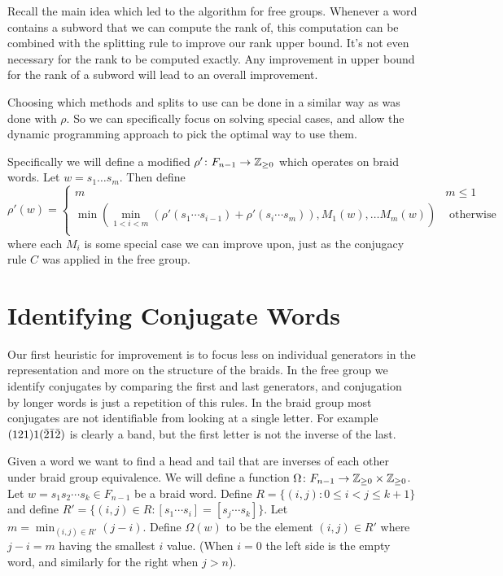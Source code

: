 \documentclass[12pt]{thesis}
\begin{document}
Recall the main idea which led to the algorithm for free groups.
Whenever a word contains a subword that we can compute the rank of,
this computation can be combined with the splitting rule to improve
our rank upper bound.
It's not even necessary for the rank to be computed exactly.
Any improvement in upper bound for the rank of a subword  will lead
to an overall improvement.
 
Choosing which methods and splits to use
can be done in a similar way as was done with $\rho$.
So we can specifically focus on solving special cases,
and allow the dynamic programming approach to pick the optimal
way to use them.

Specifically we will define a modified $\rho' \colon F_{n-1} \rightarrow \mathbb{Z}_{\geq 0}$ which operates
on braid words.
Let $w = s_{1} \ldots s_{m}$. Then define
\begin{equation}
\rho'(w) =
\begin{cases}
    m & m \leq 1 \\
    \min( \min_{1< i < m} ( \rho'(s_{1} \cdots s_{i - 1}) + \rho'(s_{i} \cdots s_{m}) ), M_{1}(w), \ldots M_{m}(w)) &  \text{ otherwise } \\
\end{cases}
\end{equation}
where each $M_{i}$ is some special
case we can improve upon, just as the conjugacy rule $C$ was applied in the free group.

\section{Identifying Conjugate Words}

Our first heuristic for improvement is to focus less on individual generators in the representation
and more on the structure of the braids.
In the free group we identify conjugates by comparing the first and last generators,
and conjugation by longer words is just a repetition of this rules.
In the braid group most conjugates are not identifiable from looking at a single
letter.
For example $(1 2 1) 1 (\bar{2} \bar{1} \bar{2})$ is clearly a band,
but the first letter is not the inverse of the last.

Given a word  we want to find a head
and tail that are inverses of each other under braid group equivalence.
We will define a function $\Omega \colon F_{n-1} \rightarrow \mathbb{Z}_{\geq 0} \times \mathbb{Z}_{\geq 0}$.
Let $w = s_{1}s_{2} \cdots  s_{k} \in F_{n-1}$ be a braid word.
Define $R = \{ (i, j) \colon  0 \leq i < j \leq k + 1 \}$ 
and define $R' = \{ (i, j) \in R \colon [s_{1}\cdots s_{i}] = [s_{j} \cdots s_{k}] \}$.
Let $m = \min_{(i, j) \in R'} (j - i)$.
Define $\Omega(w)$ to be the element $(i, j) \in R'$
where $j - i = m$ having the smallest $i$ value.
(When $i = 0$ the left side is the empty word, and similarly for the right when $j > n$).
\end{document}
